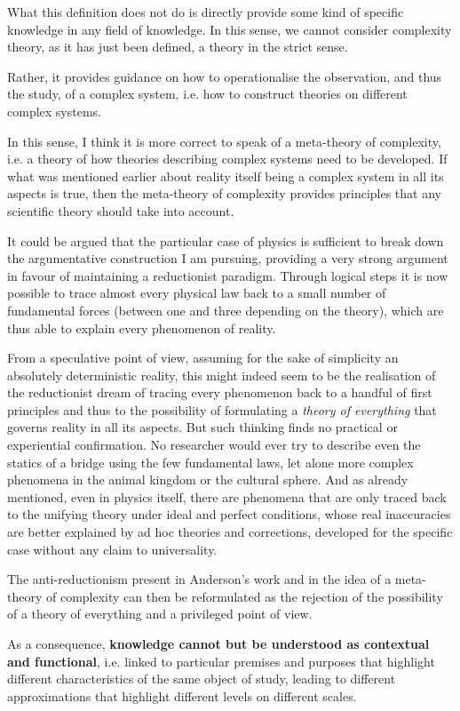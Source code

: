 \documentclass[a4paper, headings=standardclasses]{scrartcl}
\begin{document}
What this definition does not do is directly provide some kind of specific knowledge in any field of knowledge.
In this sense, we cannot consider complexity theory, as it has just been defined, a theory in the strict sense.

Rather, it provides guidance on how to operationalise the observation, and thus the study, of a complex system, i.e. how to construct theories on different complex systems.

In this sense, I think it is more correct to speak of a meta-theory of complexity, i.e. a theory of how theories describing complex systems need to be developed. If what was mentioned earlier about reality itself being a complex system in all its aspects is true, then the meta-theory of complexity provides principles that any scientific theory should take into account.

It could be argued that the particular case of physics is sufficient to break down the argumentative construction I am pursuing, providing a very strong argument in favour of maintaining a reductionist paradigm.
Through logical steps it is now possible to trace almost every physical law back to a small number of fundamental forces (between one and three depending on the theory), which are thus able to explain every phenomenon of reality.

From a speculative point of view, assuming for the sake of simplicity an absolutely deterministic reality, this might indeed seem to be the realisation of the reductionist dream of tracing every phenomenon back to a handful of first principles and thus to the possibility of formulating a \textit{theory of everything} that governs reality in all its aspects. But such thinking finds no practical or experiential confirmation.
No researcher would ever try to describe even the statics of a bridge using the few fundamental laws, let alone more complex phenomena in the animal kingdom or the cultural sphere.
And as already mentioned, even in physics itself, there are phenomena that are only traced back to the unifying theory under ideal and perfect conditions, whose real inaccuracies are better explained by ad hoc theories and corrections, developed for the specific case without any claim to universality.

The anti-reductionism present in Anderson's work and in the idea of a meta-theory of complexity can then be reformulated as the rejection of the possibility of a theory of everything and a privileged point of view.

As a consequence, \textbf{knowledge cannot but be understood as contextual and functional}, i.e. linked to particular premises and purposes that highlight different characteristics of the same object of study, leading to different approximations that highlight different levels on different scales.
\end{document}
